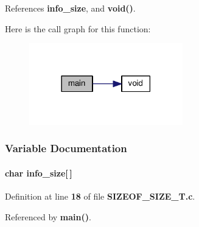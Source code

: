 References {\bf info\+\_\+size}, and {\bf void()}.



Here is the call graph for this function\+:
\nopagebreak
\begin{figure}[H]
\begin{center}
\leavevmode
\includegraphics[width=189pt]{d4/dd3/SIZEOF__SIZE__T_8c_a0ddf1224851353fc92bfbff6f499fa97_cgraph}
\end{center}
\end{figure}




\subsubsection{Variable Documentation}
\paragraph[{info\+\_\+size}]{\setlength{\rightskip}{0pt plus 5cm}char info\+\_\+size[$\,$]}\label{SIZEOF__SIZE__T_8c_a0355ddcca1b74f883f20cc208db8790b}


Definition at line {\bf 18} of file {\bf S\+I\+Z\+E\+O\+F\+\_\+\+S\+I\+Z\+E\+\_\+\+T.\+c}.



Referenced by {\bf main()}.

